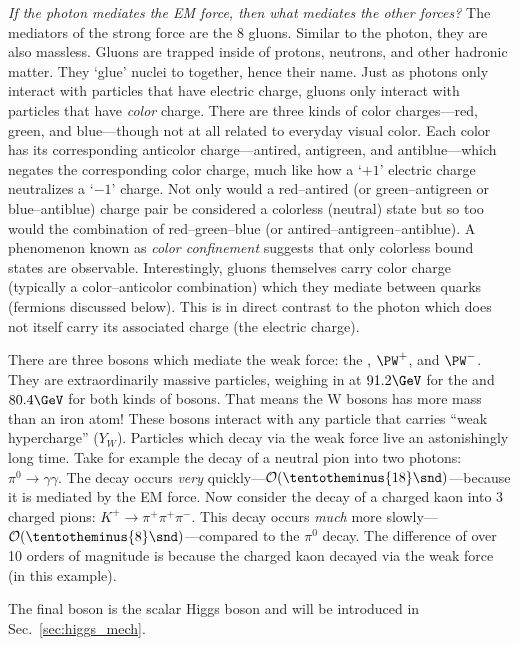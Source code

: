 \emph{If the photon mediates the EM force, then what mediates the other forces?}
The mediators of the strong force are the 8 gluons. 
Similar to the photon, they are also massless.
Gluons are trapped inside of protons, neutrons, and other hadronic matter. 
They `glue' nuclei to together, hence their name.
Just as photons only interact with particles that have electric charge, gluons only interact with particles that have \emph{color} charge.
There are three kinds of color charges---red, green, and blue---though not at all related to everyday visual color.
Each color has its corresponding anticolor charge---antired, antigreen, and antiblue---which negates the corresponding color charge, much like how a `$+1$' electric charge neutralizes a `$-1$' charge.
Not only would a red--antired (or green--antigreen or blue--antiblue) charge pair be considered a colorless (neutral) state but so too would the combination of red--green--blue (or antired--antigreen--antiblue).
A phenomenon known as \emph{color confinement} suggests that only colorless bound states are observable.
Interestingly, gluons themselves carry color charge (typically a color--anticolor combination) which they mediate between quarks (fermions discussed below).  %
This is in direct contrast to the photon which does not itself carry its associated charge (the electric charge).

There are three bosons which mediate the weak force: the \PZ, $\PW^+$, and $\PW^-$.
They are extraordinarily massive particles, weighing in at $91.2\GeV$ for the \PZ and $80.4\GeV$ for both kinds of \PW bosons. 
That means the W bosons has more mass than an iron atom!
These bosons interact with any particle that carries ``weak hypercharge'' ($Y_W$).
Particles which decay via the weak force live an astonishingly long time. 
Take for example the decay of a neutral pion into two photons:
$\pi^0 \to \gamma \gamma$. 
The decay occurs \emph{very} quickly---$\mathcal{O}(\tentotheminus{18}\snd)$---because it is mediated by the EM force.
Now consider the decay of a charged kaon into 3 charged pions:
$K^+ \to \pi^+ \pi^+ \pi^-$.
This decay occurs \emph{much} more slowly---$\mathcal{O}(\tentotheminus{8}\snd)$---compared to the $\pi^0$ decay.
The difference of over 10 orders of magnitude is because the charged kaon decayed via the weak force (in this example).

The final boson is the scalar Higgs boson and will be introduced in Sec.~\ref{sec:higgs_mech}.

